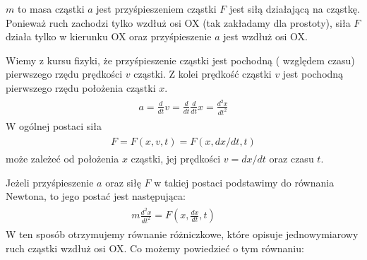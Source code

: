\documentclass[a4paper,12pt,polish]{sphinxmanual}
\begin{document}
$m$  to masa cząstki
$a$ jest przyśpieszeniem cząstki
$F$ jest siłą działającą na cząstkę.
Ponieważ ruch zachodzi tylko wzdłuż osi OX (tak zakładamy dla prostoty), siła  $F$  działa tylko w kierunku OX oraz przyśpieszenie $a$ jest wzdłuż osi OX.

Wiemy z kursu fizyki, że przyśpieszenie cząstki jest pochodną ( względem czasu) pierwszego rzędu prędkości $v$ cząstki. Z kolei prędkość cząstki $v$ jest pochodną pierwszego rzędu położenia cząstki $x$.
\label{ch1/chI011:equation-eqn2}\begin{gather}
\begin{split}a= \frac{d}{dt} v= \frac{d}{dt} \frac{d}{dt} x = \frac{d^2x}{dt^2}\end{split}\label{ch1/chI011-eqn2}
\end{gather}
W ogólnej postaci siła
\label{ch1/chI011:equation-eqn3}\begin{gather}
\begin{split}F = F(x, v, t) = F(x, dx/dt, t)\end{split}\label{ch1/chI011-eqn3}
\end{gather}
może zależeć od położenia $x$ cząstki, jej prędkości $v=dx/dt$ oraz czasu $t$.

Jeżeli przyśpieszenie $a$ oraz siłę $F$ w takiej postaci podstawimy do równania Newtona, to jego postać jest następująca:
\label{ch1/chI011:equation-eqn4}\begin{gather}
\begin{split} m  \frac{d^2x}{dt^2} = F\left(x, \frac{dx}{dt}, t\right) \qquad\end{split}\label{ch1/chI011-eqn4}
\end{gather}
W ten sposób otrzymujemy równanie różniczkowe, które opisuje jednowymiarowy ruch cząstki wzdłuż osi OX.  Co możemy powiedzieć o tym równaniu:
\end{document}
